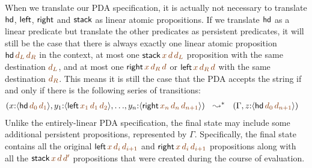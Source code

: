 When we translate our PDA specification, it is actually not necessary
to translate ${\sf hd}$, ${\sf left}$, ${\sf right}$ and ${\sf stack}$ as
linear atomic propositions. If we translate ${\sf hd}$ as
a linear predicate but translate the other predicates as persistent
predicates, it will still be the case that there is always exactly one
linear atomic proposition ${\sf hd}\,\lf{d_L}\,\lf{d_R}$ 
in the context, at most one
${\sf stack}\,\lf{x}\,\lf{d}\,\lf{d_L}$ 
proposition with the same destination $\lf{d_L}$, 
and at most one ${\sf right}\,\lf{x}\,\lf{d_R}\,\lf{d}$ or 
${\sf left}\,\lf{x}\,\lf{d_R}\,\lf{d}$ 
with the same destination $\lf{d_R}$. This means it is still the case that the
PDA accepts the string if and only if there is the following series of 
transitions:
\begin{align*}
(    x{:}\susp{{\sf hd}\,\lf{d_0}\,\lf{d_1}}, 
    y_1{:}\susp{{\sf left}\,\lf{x_1}\,\lf{d_1}\,\lf{d_2}},
    \ldots&,
    y_n{:}\susp{{\sf right}\,\lf{x_n}\,\lf{d_n}\,\lf{d_{n+1}}})%
~~ \leadsto^* ~~
(\Gamma, z{:}\susp{{\sf hd}\,\lf{d_0}\,\lf{d_{n+1}}})%
\end{align*}
Unlike the entirely-linear PDA specification, the final state may include
some additional 
persistent propositions, represented by $\Gamma$. Specifically, the final state
contains all the original ${\sf left}\,\lf{x}\,\lf{d_i}\,\lf{d_{i+1}}$ and
${\sf right}\,\lf{x}\,\lf{d_i}\,\lf{d_{i+1}}$ propositions 
along with all the ${\sf stack}\,\lf{x}\,\lf{d}\,\lf{d'}$ 
propositions that were created
during the course of evaluation.


